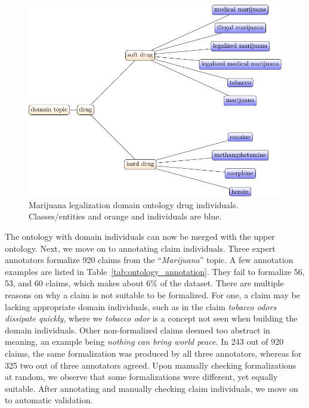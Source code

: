 \begin{figure}
\includegraphics{formalizations_drug_hierarchy-figure0.pdf}
\caption{Marijuana legalization domain ontology drug individuals. 
	Classes/entities and orange and individuals are blue. }
	\label{fig:drug_domain_individuals}
\end{figure}


The ontology with domain individuals can now be merged with the upper ontology. 
Next, we move on to annotating claim individuals. Three expert annotators
formalize 920 claims from the ``\emph{Marijuana}'' topic. A few annotation
examples are listed in Table~\ref{tab:ontology_annotation}.
They fail to formalize 56, 53, and 60 claims, which makes about 6\% of the dataset. 
There are multiple reasons on why a claim is not suitable to be formalized. 
For one, a claim may be lacking appropriate domain individuals, such as in the claim
\emph{tobacco odors dissipate quickly}, where we \emph{tobacco odor} is a concept
not seen when building the domain individuals. Other non-formalized claims
deemed too abstract in meaning, an example being \emph{nothing can bring 
world peace}. In 243 out of 920 claims, the same formalization was produced 
by all three annotators, whereas for 325 two out of three annotators agreed. 
Upon manually checking formalizations at random, we observe that some
formalizations were different, yet equally suitable. After annotating and manually
checking claim individuals, we move on to  automatic validation. 

